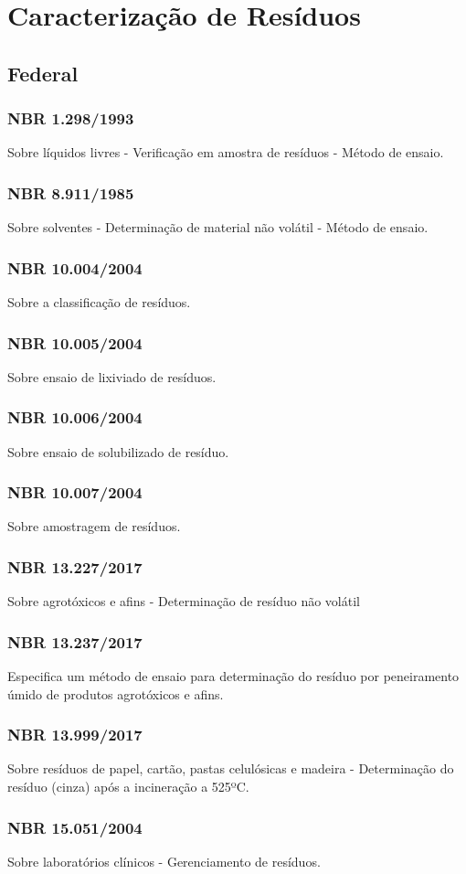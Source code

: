 \section{Caracterização de Resíduos}

\begin{subapend}
	\subsection{Federal}
	\begin{subsubapend}
		\subsubsection{NBR 1.298/1993}
		Sobre líquidos livres - Verificação em amostra de resíduos - Método de ensaio.
		\subsubsection{NBR 8.911/1985}
		Sobre solventes - Determinação de material não volátil - Método de ensaio.
		\subsubsection{NBR 10.004/2004}
		Sobre a classificação de resíduos.
		\subsubsection{NBR 10.005/2004}
		Sobre ensaio de lixiviado de resíduos.
		\subsubsection{NBR 10.006/2004}
		Sobre ensaio de solubilizado de resíduo.
		\subsubsection{NBR 10.007/2004}
		Sobre amostragem de resíduos.
		\subsubsection{NBR 13.227/2017}
		Sobre agrotóxicos e afins - Determinação de resíduo não volátil
		\subsubsection{NBR 13.237/2017}
		Especifica um método de ensaio para determinação do resíduo por peneiramento úmido de produtos agrotóxicos e afins.
		\subsubsection{NBR 13.999/2017}
		Sobre resíduos de papel, cartão, pastas celulósicas e madeira - Determinação do resíduo (cinza) após a incineração a 525ºC.
		\subsubsection{NBR 15.051/2004}
		Sobre laboratórios clínicos - Gerenciamento de resíduos.
	\end{subsubapend}
\end{subapend}


